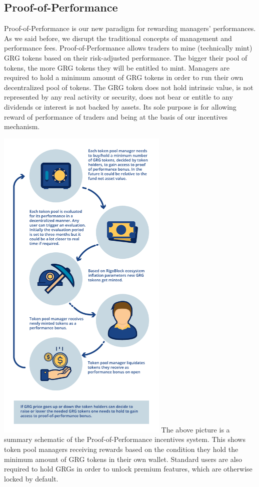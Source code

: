\documentclass[9pt,oneside]{amsart}
\begin{document}
\begin{multicols}{2}
\section{Proof-of-Performance}
Proof-of-Performance is our new paradigm for rewarding managers’ performances. As we said before, we disrupt the traditional concepts of management and performance fees. Proof-of-Performance allows traders to mine (technically mint) GRG tokens based on their risk-adjusted performance. The bigger their pool of tokens, the more GRG tokens they will be entitled to mint. Managers are required to hold a minimum amount of GRG tokens in order to run their own decentralized pool of tokens.
The GRG token does not hold intrinsic value, is not represented by any real activity or security, does not bear or entitle to any dividends or interest is not backed by assets. Its sole purpose is for allowing reward of performance of traders and being at the basis of our incentives mechanism.

\includegraphics[width=8.2cm]{pop-tokenomics.png}
The above picture is a summary schematic of the Proof-of-Performance incentives system. This shows token pool managers receiving rewards based on the condition they hold the minimum amount of GRG tokens in their own wallet. Standard users are also required to hold GRGs in order to unlock premium features, which are otherwise locked by default. 


\end{multicols}
\end{document}
